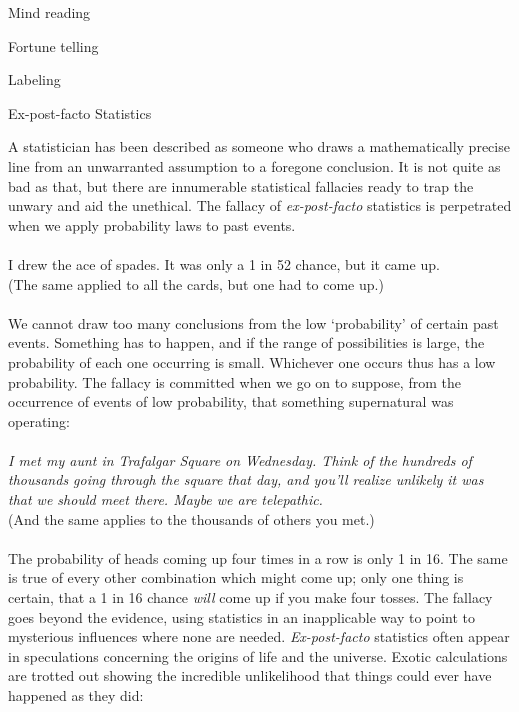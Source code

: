 \documentclass[a4paper,12pt,single,pdftex]{scrartcl}
\begin{document}
Mind reading

Fortune telling

Labeling

Ex-post-facto Statistics
    
      A statistician has been described as someone who draws a mathematically precise line from an unwarranted assumption to a foregone conclusion. It is not quite as bad as that, but there are innumerable statistical fallacies ready to trap the unwary and aid the unethical. The fallacy of {\em ex-post-facto}  statistics is perpetrated when we apply probability laws to past events.
    \\

    
       
    \\

    
      I drew the ace of spades. It was only a 1 in 52 chance, but it came up.
    \\

    
      (The same applied to all the cards, but one had to come up.)
    \\

    
       
    \\

    
      We cannot draw too many conclusions from the low ‘probability’ of certain past events. Something has to happen, and if the range of possibilities is large, the probability of each one occurring is small. Whichever one occurs thus has a low probability. The fallacy is committed when we go on to suppose, from the occurrence of events of low probability, that something supernatural was operating:
    \\

    
       
    \\

    
      {\em I met my aunt in Trafalgar Square on Wednesday. Think of the hundreds of thousands going through the square that day, and you’ll realize unlikely it was that we should meet there. Maybe we are telepathic.}
    \\

    
      (And the same applies to the thousands of others you met.)
    \\

    
       
    \\

    
      The probability of heads coming up four times in a row is only 1 in 16. The same is true of every other combination which might come up; only one thing is certain, that a 1 in 16 chance {\em will} come up if you make four tosses. The fallacy goes beyond the evidence, using statistics in an inapplicable way to point to mysterious influences where none are needed. {\em Ex-post-facto} statistics often appear in speculations concerning the origins of life and the universe. Exotic calculations are trotted out showing the incredible unlikelihood that things could ever have happened as they did:
    \\
\end{document}
